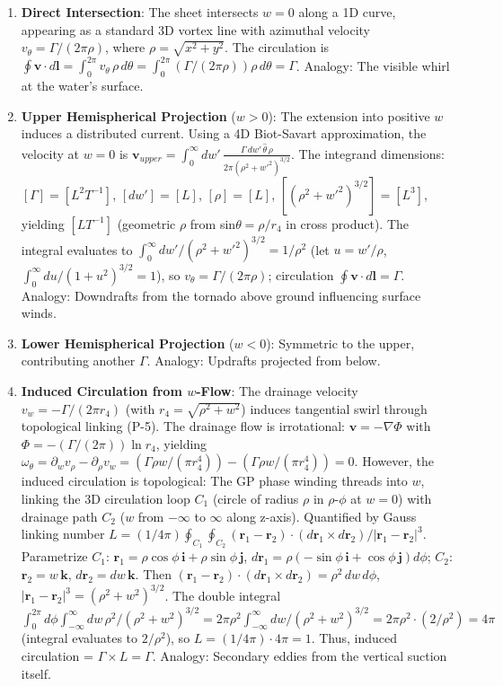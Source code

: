 \begin{enumerate}
\item \textbf{Direct Intersection}: The sheet intersects $w=0$ along a 1D curve, appearing as a standard 3D vortex line with azimuthal velocity $v_\theta = \Gamma / (2\pi \rho)$, where $\rho = \sqrt{x^2 + y^2}$. The circulation is $\oint \mathbf{v} \cdot d\mathbf{l} = \int_0^{2\pi} v_\theta \, \rho \, d\theta = \int_0^{2\pi} (\Gamma / (2\pi \rho)) \rho \, d\theta = \Gamma$. Analogy: The visible whirl at the water's surface.
\item \textbf{Upper Hemispherical Projection} ($w > 0$): The extension into positive $w$ induces a distributed current. Using a 4D Biot-Savart approximation, the velocity at $w=0$ is $\mathbf{v}_{upper} = \int_0^\infty dw' \, \frac{\Gamma \, dw' \, \hat{\theta} \, \rho}{2\pi (\rho^2 + w'^2)^{3/2}}$. The integrand dimensions: $[\Gamma] = [L^2 T^{-1}]$, $[dw'] = [L]$, $[\rho] = [L]$, $[(\rho^2 + w'^2)^{3/2}] = [L^3]$, yielding $[LT^{-1}]$ (geometric $\rho$ from sin$\theta = \rho / r_4$ in cross product). The integral evaluates to $\int_0^\infty dw' / (\rho^2 + w'^2)^{3/2} = 1 / \rho^2$ (let $u = w' / \rho$, $\int_0^\infty du / (1 + u^2)^{3/2} = 1$), so $v_\theta = \Gamma / (2\pi \rho)$; circulation $\oint \mathbf{v} \cdot d\mathbf{l} = \Gamma$. Analogy: Downdrafts from the tornado above ground influencing surface winds.
\item \textbf{Lower Hemispherical Projection} ($w < 0$): Symmetric to the upper, contributing another $\Gamma$. Analogy: Updrafts projected from below.
\item \textbf{Induced Circulation from $w$-Flow}: The drainage velocity $v_w = -\Gamma / (2\pi r_4)$ (with $r_4 = \sqrt{\rho^2 + w^2}$) induces tangential swirl through topological linking (P-5). The drainage flow is irrotational: $\mathbf{v} = -\nabla \Phi$ with $\Phi = -(\Gamma / (2\pi)) \ln r_4$, yielding $\omega_\theta = \partial_w v_\rho - \partial_\rho v_w = (\Gamma \rho w / (\pi r_4^4)) - (\Gamma \rho w / (\pi r_4^4)) = 0$. However, the induced circulation is topological: The GP phase winding threads into $w$, linking the 3D circulation loop $C_1$ (circle of radius $\rho$ in $\rho$-$\phi$ at $w=0$) with drainage path $C_2$ ($w$ from $-\infty$ to $\infty$ along z-axis). Quantified by Gauss linking number $L = (1 / 4\pi) \oint_{C_1} \oint_{C_2} (\mathbf{r}_1 - \mathbf{r}_2) \cdot (d\mathbf{r}_1 \times d\mathbf{r}_2) / |\mathbf{r}_1 - \mathbf{r}_2|^3$. Parametrize $C_1$: $\mathbf{r}_1 = \rho \cos\phi \, \mathbf{i} + \rho \sin\phi \, \mathbf{j}$, $d\mathbf{r}_1 = \rho (-\sin\phi \, \mathbf{i} + \cos\phi \, \mathbf{j}) d\phi$; $C_2$: $\mathbf{r}_2 = w \, \mathbf{k}$, $d\mathbf{r}_2 = dw \, \mathbf{k}$. Then $(\mathbf{r}_1 - \mathbf{r}_2) \cdot (d\mathbf{r}_1 \times d\mathbf{r}_2) = \rho^2 \, dw \, d\phi$, $|\mathbf{r}_1 - \mathbf{r}_2|^3 = (\rho^2 + w^2)^{3/2}$. The double integral $\int_0^{2\pi} d\phi \int_{-\infty}^{\infty} dw \, \rho^2 / (\rho^2 + w^2)^{3/2} = 2\pi \rho^2 \int_{-\infty}^{\infty} dw / (\rho^2 + w^2)^{3/2} = 2\pi \rho^2 \cdot (2 / \rho^2) = 4\pi$ (integral evaluates to $2 / \rho^2$), so $L = (1 / 4\pi) \cdot 4\pi = 1$. Thus, induced circulation = $\Gamma \times L = \Gamma$. Analogy: Secondary eddies from the vertical suction itself.

\end{enumerate}
